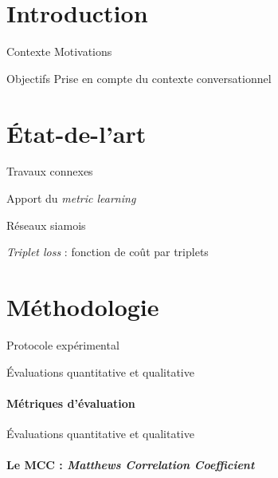 \documentclass[11pt,aspectratio=169]{beamer}
\begin{document}
\section{Introduction}

\begin{frame}{Contexte}
    Motivations
\end{frame}

\begin{frame}{Objectifs}
    Prise en compte du contexte conversationnel
\end{frame}

\section{État-de-l'art}

\begin{frame}{Travaux connexes}
    
\end{frame}

\begin{frame}{Apport du \textsl{metric learning}}

\end{frame}

\begin{frame}{Réseaux siamois}
    
\end{frame}

\begin{frame}{\textsl{Triplet loss} : fonction de coût par triplets}
    
\end{frame}

\section{Méthodologie}

\begin{frame}{Protocole expérimental}
    
\end{frame}

\begin{frame}{Évaluations quantitative et qualitative}
    \framesubtitle{Métriques d'évaluation}
    
\end{frame}

\begin{frame}{Évaluations quantitative et qualitative}
    \framesubtitle{Le MCC : \textsl{Matthews Correlation Coefficient}}
    
\end{frame}
\end{document}
